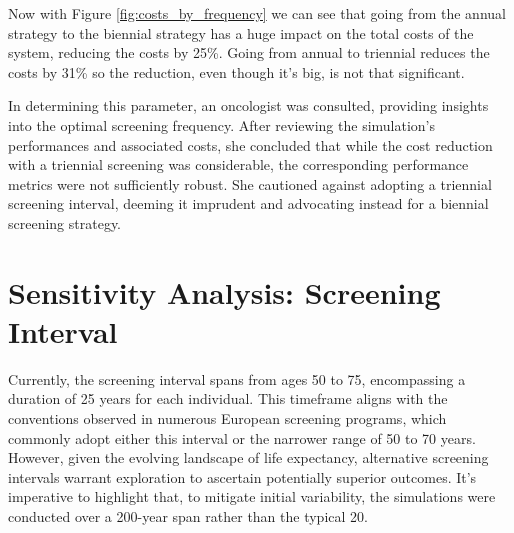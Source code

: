 Now with Figure \ref{fig:costs_by_frequency} we can see that going from the annual strategy to the biennial strategy has a huge impact on the total costs of the system, reducing the costs by 25\%. Going from annual to triennial reduces the costs by 31\% so the reduction, even though it’s big, is not that significant.

In determining this parameter, an oncologist was consulted, providing insights into the optimal screening frequency. After reviewing the simulation's performances and associated costs, she concluded that while the cost reduction with a triennial screening was considerable, the corresponding performance metrics were not sufficiently robust. She cautioned against adopting a triennial screening interval, deeming it imprudent and advocating instead for a biennial screening strategy.

\section{Sensitivity Analysis: Screening Interval}

Currently, the screening interval spans from ages 50 to 75, encompassing a duration of 25 years for each individual. This timeframe aligns with the conventions observed in numerous European screening programs, which commonly adopt either this interval or the narrower range of 50 to 70 years. However, given the evolving landscape of life expectancy, alternative screening intervals warrant exploration to ascertain potentially superior outcomes. It's imperative to highlight that, to mitigate initial variability, the simulations were conducted over a 200-year span rather than the typical 20.

